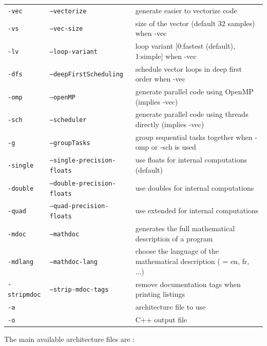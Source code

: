 \documentclass[a4paper,10pt]{book}
\begin{document}
\begin{supertabular}{|p{1.5cm}|p{4cm}|p{5cm}|}
\hline
\texttt{-vec} 				& \texttt{--vectorize}				& generate easier to vectorize code  \\
\texttt{-vs }		& \texttt{--vec-size }		& size of the vector (default 32 samples) when -vec \\
\texttt{-lv }		& \texttt{--loop-variant }	& loop variant [0:fastest (default), 1:simple] when -vec\\
\texttt{-dfs} 				& \texttt{--deepFirstScheduling}	& schedule vector loops in deep first order when -vec \\
\hline
\texttt{-omp} 				& \texttt{--openMP}					& generate parallel code using OpenMP (implies -vec)  \\
\texttt{-sch} 				& \texttt{--scheduler}				& generate parallel code using threads directly (implies -vec)  \\
\texttt{-g} 				& \texttt{--groupTasks}				& group sequential tasks together when -omp or -sch is used \\
\hline
\texttt{-single} 			& \texttt{--single-precision-floats} & use floats for internal computations (default)  \\
\texttt{-double} 			& \texttt{--double-precision-floats} & use doubles for internal computations  \\
\texttt{-quad} 				& \texttt{--quad-precision-floats}	&  use extended for internal computations  \\
\hline
\texttt{-mdoc} 				& \texttt{--mathdoc}				& generates the full mathematical description of a \faust program \\
\texttt{-mdlang }			& \texttt{--mathdoc-lang } 		& choose the language of the mathematical description ( = en, fr, ...) \\
\texttt{-stripmdoc} 			& \texttt{--strip-mdoc-tags}		& remove documentation tags when printing \faust listings\\
\hline
\texttt{-a } 	&  									& architecture file to use  \\
\texttt{-o } 	&  									& C++ output file\\
\end{supertabular} 
\normalsize

\bigskip

The main available architecture files are :

\bigskip
\end{document}
